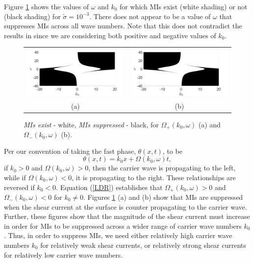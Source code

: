 \documentclass[a4paper,11pt]{article}
\begin{document}
Figure \ref{fig:miplot} shows the values of $\omega$ and $k_{0}$ for which MIs exist (white shading) or not (black shading) for $\tilde{\sigma}=10^{-3}$.   There does not appear to be a value of $\omega$ that suppresses MIs across all wave numbers.  Note that this does not contradict the results in \cite{thomas2012nonlinear} since we are considering both positive and negative values of $k_{0}$.
\begin{figure}[!h]
\centering
\begin{tabular}{cc}
\includegraphics[width=.5\textwidth]{foc_defoc_pos_cut} & \includegraphics[width=.5\textwidth]{foc_defoc_neg_cut}\\
(a) & (b)\\
\end{tabular}
\caption{ {\it MIs exist} - white, {\it MIs suppressed} - black, for $\Omega_{+}(k_{0},\omega)$ (a) and $\Omega_{-}(k_{0},\omega)$ (b).}
\label{fig:miplot}
\end{figure}

Per our convention of taking the fast phase, $\theta(x,t)$, to be
\[
\theta(x,t) = k_{0}x + \Omega(k_{0},\omega) t,
\]
if $k_{0}>0$ and $\Omega(k_{0},\omega)>0$, then the carrier wave is propagating to the left, while if $\Omega(k_{0},\omega)<0$, it is propagating to the right.  These relationships are reversed if $k_{0}<0$.  Equation (\ref{LDR}) establishes that $\Omega_{+}(k_{0},\omega) > 0$ and $\Omega_{-}(k_{0},\omega) < 0$ for $k_{0}\neq0$.  Figures \ref{fig:miplot} (a) and (b) show that MIs are suppressed when the shear current at the surface is counter propagating to the carrier wave.  Further, these figures show that the magnitude of the shear current must increase in order for MIs to be suppressed across a wider range of carrier wave numbers $k_{0}$.  Thus, in order to suppress MIs, we need either relatively high carrier wave numbers $k_{0}$ for relatively weak shear currents, or relatively strong shear currents for relatively low carrier wave numbers. 
\end{document}
